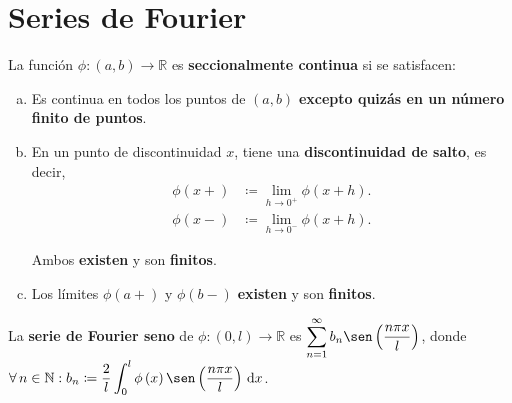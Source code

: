 \section{Series de Fourier}

\begin{definition}
    La función
    \begin{math}
        \phi\colon\left(a,b\right)\to\mathbb{R}
    \end{math}
    es \textbf{seccionalmente continua} si se satisfacen:

    \begin{enumerate}[(a)]
        \item

              Es continua en todos los puntos de $\left(a,b\right)$
              \textbf{excepto quizás en un número finito de puntos}.

        \item

              En un punto de discontinuidad $x$, tiene una
              \textbf{discontinuidad de salto}, es decir,
              \begin{align*}
                  \phi\left(x+\right) & \coloneqq
                  \lim_{h\to0^{+}}
                  \phi\left(x+h\right).           \\
                  \phi\left(x-\right) & \coloneqq
                  \lim_{h\to0^{-}}
                  \phi\left(x+h\right).
              \end{align*}

              Ambos \textbf{existen} y son \textbf{finitos}.

        \item

              Los límites $\phi\left(a+\right)$ y
              $\phi\left(b-\right)$ \textbf{existen} y son
              \textbf{finitos}.
    \end{enumerate}
\end{definition}

\begin{definition}
    La \textbf{serie de Fourier seno} de
    $\phi\colon\left(0,l\right)\to\mathbb{R}$ es
    \begin{math}\displaystyle
        \sum_{n=1}^{\infty}
        b_{n}
        \sen
        \left(\frac{n\pi x}{l}\right)
    \end{math},
    donde
    \begin{math}\displaystyle
        \forall n\in
        \mathbb{N}:
        b_{n}\coloneq
        \frac{2}{l}
        \int_{0}^{l}
        \phi\left(x\right)
        \sen
        \left(\frac{n\pi x}{l}\right)
        \dl x
    \end{math}.
\end{definition}

